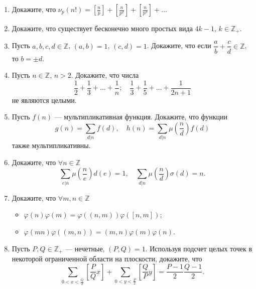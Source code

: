 \documentclass[a4paper, 11pt]{article}
\begin{document}
\begin{enumerate}[topsep=0pt]
\begin{itemize}[noitemsep,topsep=0pt]
        \item $(a,b)[a,b]=ab$;
        \item $(a+b,[a,b])=(a,b)$.
    \end{itemize}
    \item Докажите, что $\nu_p(n!)= \left[\frac{n}{p}\right] + \left[\frac{n}{p^2}\right] + \left[\frac{n}{p^3}\right] + \dots $
    \item Докажите, что существует бесконечно много простых вида $4k-1$, $k\in\mathbb{Z}_{+}$. %
    \item Пусть $a,b,c,d \in \mathbb{Z}$, $(a,b)=1$, $(c,d)=1$. Докажите, что если $\dfrac{a}{b}+\dfrac{c}{d} \in \mathbb{Z}$, то $b=\pm d$.
    \item Пусть $n \in \mathbb{Z}$, $n>2$. Докажите, что числа
    \[\dfrac{1}{2}+\dfrac{1}{3}+\dots+\dfrac{1}{n};\quad \dfrac{1}{3}+\dfrac{1}{5}+\dots+\dfrac{1}{2n+1}
    \]
    не являются целыми.
    \item Пусть $f(n)$ --- мультипликативная функция. Докажите, что функции
    \[g(n)=\sum\limits_{d|n} f(d),\quad h(n)=\sum\limits_{d|n} \mu\left(\frac{n}{d}\right)f(d)\]
    также мультипликативны.
    \item Докажите, что $\forall n \in \mathbb{Z}$
    \[\sum\limits_{e|n} \mu\left(\frac{n}{e}\right) d(e) = 1,\quad \sum\limits_{d|n} \mu\left(\frac{n}{d}\right) \sigma(d) = n.
    \]
    \item Докажите, что $\forall m,n \in \mathbb{Z}$
    \begin{itemize}[noitemsep,topsep=0pt]
        \item $\varphi(n)\varphi(m)=\varphi((n,m))\varphi([n,m])$;
        \item $\varphi(mn)\varphi((m,n))=(m,n)\varphi(m)\varphi(n)$.
    \end{itemize}
    \item Пусть $P,Q\in\mathbb{Z}_+$ --- нечетные, $(P,Q)=1$. Используя подсчет целых точек в некоторой ограниченной области на плоскости, докажите, что 
    \[\sum_{0<x<\frac{Q}{2}}\left[\frac{P}{Q}x\right] + \sum_{0<y<\frac{P}{2}}\left[\frac{Q}{P}y\right] = \frac{P-1}{2}\frac{Q-1}{2}.\]
    
\end{enumerate}


\end{document}
